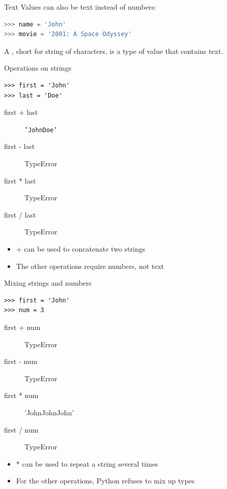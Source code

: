 \documentclass{beamer}
\begin{document}
\begin{frame}[fragile]{Text}
Values can also be text instead of numbers:
\begin{lstlisting}[language=python]
>>> name = 'John'
>>> movie = '2001: A Space Odyssey'
\end{lstlisting}

\pause
    \begin{definition}
        A , short for string of characters,
        is a type of value that contains text.
    \end{definition}
\end{frame}

\begin{frame}[fragile]{Operations on strings}
\begin{lstlisting}
>>> first = 'John'
>>> last = 'Doe'
\end{lstlisting}
\begin{description}
    \item[first + last] \texttt{'JohnDoe'}
    \item[first - last] TypeError
    \item[first * last] TypeError
    \item[first / last] TypeError
\end{description}

\begin{itemize}
\item + can be used to concatenate two strings
\item The other operations require numbers, not text
\end{itemize}
\end{frame}

\begin{frame}[fragile]{Mixing strings and numbers}
\begin{lstlisting}
>>> first = 'John'
>>> num = 3
\end{lstlisting}
\begin{description}
    \item[first + num] TypeError
    \item[first - num] TypeError
    \item[first * num] 'JohnJohnJohn'
    \item[first / num] TypeError
\end{description}

\begin{itemize}
\item * can be used to repeat a string several times
\item For the other operations, Python refuses to mix up types
\end{itemize}
\end{frame}
\end{document}
